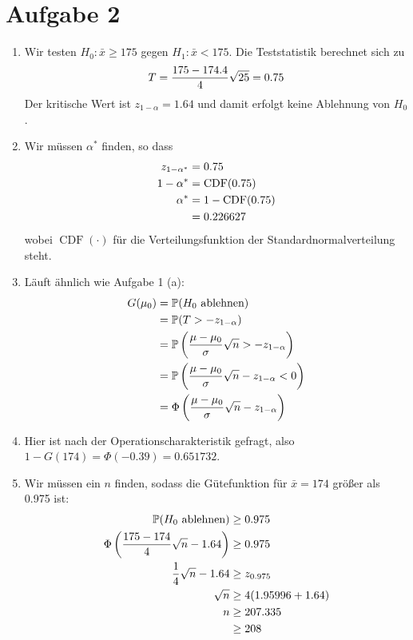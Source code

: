 \documentclass{article}
\DeclareMathOperator{\CDF}{CDF}
\begin{document}
	\section*{Aufgabe 2}
	\begin{enumerate}[label=(\alph*)]
		\item Wir testen $H_0: \bar{x} \ge 175$ gegen $H_1:\bar{x} < 175$. Die Teststatistik berechnet sich zu
		\begin{align}
			T = \frac{175-174.4}{4}\sqrt{25} = 0.75 \notag
		\end{align}
		Der kritische Wert ist $z_{1-\alpha}=1.64$ und damit erfolgt keine Ablehnung von $H_0$.
		\item Wir müssen $\alpha^\ast$ finden, so dass
		\begin{align}
			z_{1-\alpha^\ast} &= 0.75 \notag \\
			1-\alpha^\ast &=  \CDF(0.75) \notag \\
			\alpha^\ast &= 1-\CDF(0.75) \notag \\
			&= 0.226627 \notag
		\end{align}
		wobei $\CDF(\cdot)$ für die Verteilungsfunktion der Standardnormalverteilung steht.
		\item Läuft ähnlich wie Aufgabe 1 (a):
		\begin{align}
			G(\mu_0) &= \mathbb{P}(H_0\text{ ablehnen}) \notag \\
			&= \mathbb{P}(T > -z_{1-\alpha}) \notag \\
			&= \mathbb{P}\left(\frac{\mu-\mu_0}{\sigma}\sqrt{n} > -z_{1-\alpha}\right) \notag \\
			&= \mathbb{P}\left(\frac{\mu-\mu_0}{\sigma}\sqrt{n} - z_{1-\alpha} < 0\right) \notag \\
			&= \Phi\left(\frac{\mu-\mu_0}{\sigma}\sqrt{n} - z_{1-\alpha}\right) \notag
		\end{align}
		\item Hier ist nach der Operationscharakteristik gefragt, also $1-G(174)=\Phi(-0.39)=0.651732$.
		\item Wir müssen ein $n$ finden, sodass die Gütefunktion für $\bar{x}=174$ größer als 0.975 ist:
		\begin{align}
			\mathbb{P}(H_0\text{ ablehnen}) &\ge 0.975 \notag \\
			\Phi\left(\frac{175-174}{4}\sqrt{n} - 1.64\right) &\ge 0.975 \notag \\
			\frac{1}{4}\sqrt{n} - 1.64 &\ge z_{0.975} \notag \\
			\sqrt{n} &\ge 4(1.95996 + 1.64) \notag \\
			n &\ge 207.335 \notag \\
			 &\ge 208 \notag
		\end{align}
	\end{enumerate}
\end{document}

